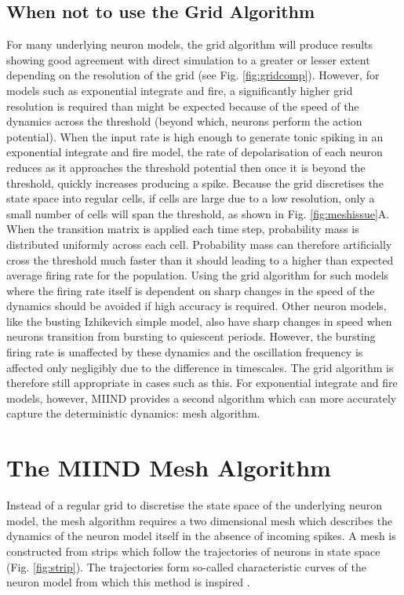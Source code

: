 \documentclass[utf8]{frontiersSCNS} %
\begin{document}
\subsection{When not to use the Grid Algorithm}
For many underlying neuron models, the grid algorithm will produce results showing good agreement with direct simulation to a greater or lesser extent depending on the resolution of the grid (see Fig. \ref{fig:gridcomp}). However, for models such as exponential integrate and fire, a significantly higher grid resolution is required than might be expected because of the speed of the dynamics across the threshold (beyond which, neurons perform the action potential). When the input rate is high enough to generate tonic spiking in an exponential integrate and fire model, the rate of depolarisation of each neuron reduces as it approaches the threshold potential then once it is beyond the threshold, quickly increases producing a spike. Because the grid discretises the state space into regular cells, if cells are large due to a low resolution, only a small number of cells will span the threshold, as shown in Fig. \ref{fig:meshissue}A. When the transition matrix is applied each time step, probability mass is distributed uniformly across each cell. Probability mass can therefore artificially cross the threshold much faster than it should leading to a higher than expected average firing rate for the population. Using the grid algorithm for such models where the firing rate itself is dependent on sharp changes in the speed of the dynamics should be avoided if high accuracy is required. Other neuron models, like the busting Izhikevich simple model, also have sharp changes in speed when neurons transition from bursting to quiescent periods. However, the bursting firing rate is unaffected by these dynamics and the oscillation frequency is affected only negligibly due to the difference in timescales. The grid algorithm is therefore still appropriate in cases such as this. For exponential integrate and fire models, however, MIIND provides a second algorithm which can more accurately capture the deterministic dynamics: mesh algorithm. 

\section{The MIIND Mesh Algorithm}
\label{miindoverview}
Instead of a regular grid to discretise the state space of the underlying neuron model, the mesh algorithm requires a two dimensional mesh which describes the dynamics of the neuron model itself in the absence of incoming spikes. A mesh is constructed from strips which follow the trajectories of neurons in state space (Fig. \ref{fig:strip}). The trajectories form so-called characteristic curves of the neuron model from which this method is inspired \citep{de2019computational,de2013generic}.
\end{document}
